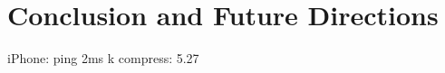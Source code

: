 \chapter{Conclusion and Future Directions}
\label{Chapter5}

% 
% 
% 
% 
% 
% 
% 
% 
% 
% 
% 
% 
% 

iPhone: ping 2ms
  k compress: 5.27
